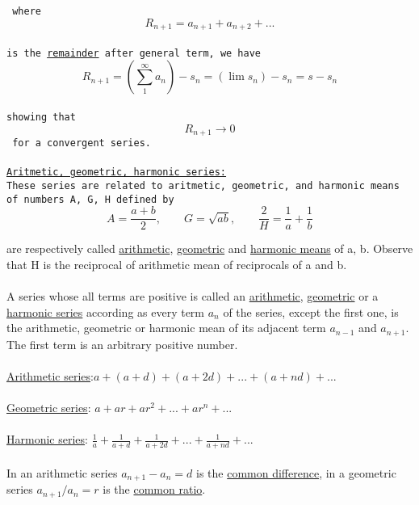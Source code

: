 \documentclass{article}
\begin{document}
\tt
\noindent where\\
{$$R_{n+1} = a_{n+1} + a_{n+2} + ...$$}\\
is the \underline {remainder} after general term, we have\\
$$R_{n+1} = (\sum_{1}^\infty a_n) - s_n = (\lim_{} s_n) - s_n = s - s_n$$\\
showing that\\
$$R_{n+1} \rightarrow 0$$
for a convergent series.\\
\\
\indent\underline{Aritmetic, geometric, harmonic series:}\\
\indent These series are related to aritmetic, geometric, and harmonic means of numbers A, G, H defined by\\

$$A= \frac{a+b}{2} ,\qquad G = \sqrt{ab},\qquad \frac{2}{H} = \frac{1}{a} + \frac{1}{b}$$

\noindent are respectively called \underline{arithmetic}, \underline{geometric} and \underline{harmonic means} of a, b. Observe that H is the reciprocal of arithmetic mean of reciprocals of a and b.\\\\

\indent A series whose all terms are positive is called an \underline{arithmetic}, \underline{geometric} or a \underline{harmonic series} according as every term $a_n$ of the series, except the first one, is the arithmetic, geometric or harmonic mean of its adjacent term $a_{n-1}$ and $a_{n+1}$. The first term is an arbitrary positive number.\\\\

\indent\underline{Arithmetic series}:$ a + (a+d) + (a+2d) + ... + (a + nd) + ...$\\\\
\indent\underline{Geometric series}: $a + ar + ar^2 + ... + ar^n + ...$\\\\
\indent\underline{Harmonic series}: $\frac{1}{a} + \frac{1}{a+d} + \frac{1}{a+2d} + ... + \frac{1}{a+nd} + ...$\\\\
\indent In an arithmetic series $a_{n+1} - a_n = d$ is the \underline{common difference}, in a geometric series $ a_{n+1}/a_n = r$ is the \underline{common ratio}.
\end{document}
